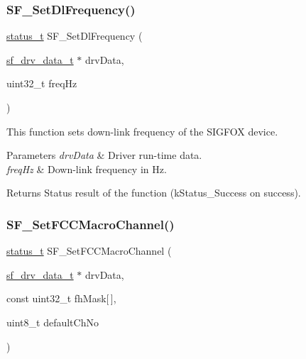 \subsubsection{\texorpdfstring{SF\_SetDlFrequency()}{SF\_SetDlFrequency()}}
{\footnotesize\ttfamily \mbox{\hyperlink{group__ksdk__common_gaaabdaf7ee58ca7269bd4bf24efcde092}{status\+\_\+t}} S\+F\+\_\+\+Set\+Dl\+Frequency (\begin{DoxyParamCaption}\item[{\mbox{\hyperlink{structsf__drv__data__t}{sf\+\_\+drv\+\_\+data\+\_\+t}} $\ast$}]{drv\+Data,  }\item[{uint32\+\_\+t}]{freq\+Hz }\end{DoxyParamCaption})}



This function sets down-\/link frequency of the S\+I\+G\+F\+OX device. 


\begin{DoxyParams}{Parameters}
{\em drv\+Data} & Driver run-\/time data. \\
\hline
{\em freq\+Hz} & Down-\/link frequency in Hz.\\
\hline
\end{DoxyParams}
\begin{DoxyReturn}{Returns}
Status result of the function (k\+Status\+\_\+\+Success on success). 
\end{DoxyReturn}
\mbox{\label{group__sf__functions__group_ga94d21504b43b2155491156bff061bf88}} 
\subsubsection{\texorpdfstring{SF\_SetFCCMacroChannel()}{SF\_SetFCCMacroChannel()}}
{\footnotesize\ttfamily \mbox{\hyperlink{group__ksdk__common_gaaabdaf7ee58ca7269bd4bf24efcde092}{status\+\_\+t}} S\+F\+\_\+\+Set\+F\+C\+C\+Macro\+Channel (\begin{DoxyParamCaption}\item[{\mbox{\hyperlink{structsf__drv__data__t}{sf\+\_\+drv\+\_\+data\+\_\+t}} $\ast$}]{drv\+Data,  }\item[{const uint32\+\_\+t}]{fh\+Mask\mbox{[}$\,$\mbox{]},  }\item[{uint8\+\_\+t}]{default\+Ch\+No }\end{DoxyParamCaption})}



